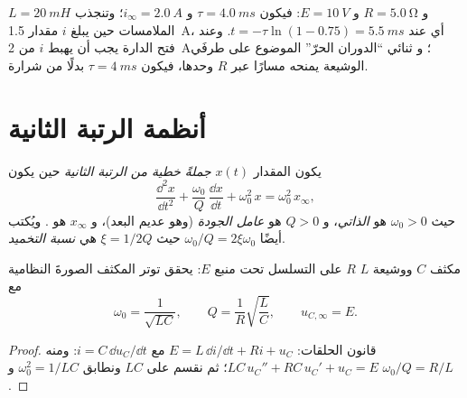 \begin{example}\label{ex:b1:transient-regimes:relay}
$L = \qty{20}{mH}$ و $R = \qty{5.0}{\ohm}$ و $E = \qty{10}{V}$: فيكون $\tau =
\qty{4.0}{ms}$ و $i_\infty = \qty{2.0}{A}$؛ وتنجذب الملامسات حين
يبلغ $i$ مقدار \qty{1.5}{A}، أي عند $t = -\tau\ln(1 - 0.75) =
\qty{5.5}{ms}$. وعند فتح الدارة يجب أن يهبط $i$ من \qty{2}{A}؛ و
ثنائي ``الدوران الحرّ'' الموضوع على طرفَي الوشيعة يمنحه مسارًا عبر $R$
وحدها، فيكون $\tau = \qty{4}{ms}$ بدلًا من شرارة.
\end{example}

\section{أنظمة الرتبة الثانية}

\begin{definition}\label{def:b1:transient-regimes:secondorder}
يكون المقدار $x(t)$ \emph{جملةً خطية من الرتبة الثانية} حين يكون
\[
\frac{\dd^2 x}{\dd t^2} + \frac{\omega_0}{Q}\,\frac{\dd x}{\dd t} + \omega_0^2\,x
= \omega_0^2\,x_\infty ,
\]
حيث $\omega_0 > 0$ هو \emph{ الذاتي}، و $Q > 0$ هو
\emph{عامل الجودة} (وهو عديم البعد)، و $x_\infty$ هو .
ويُكتب أيضًا $\omega_0/Q = 2\xi\omega_0$ حيث $\xi = 1/2Q$ هي
\emph{نسبة التخميد}.
\end{definition}

\begin{proposition}\label{prop:b1:transient-regimes:rlc}
مكثف $C$ ووشيعة $L$  $R$ على التسلسل تحت منبع
$E$: يحقق توتر المكثف الصورةَ النظامية مع
\[
\omega_0 = \frac{1}{\sqrt{LC}}, \qquad Q = \frac{1}{R}\sqrt{\frac{L}{C}},
\qquad u_{C,\infty} = E .
\]
\end{proposition}

\begin{proof}
قانون الحلقات: $E = L\,\dd i/\dd t + Ri + u_C$ مع $i = C\,\dd u_C/\dd t$:
ومنه $LC\,u_C'' + RC\,u_C' + u_C = E$؛ ثم نقسم على $LC$ ونطابق
$\omega_0^2 = 1/LC$ و $\omega_0/Q = R/L$.
\end{proof}

